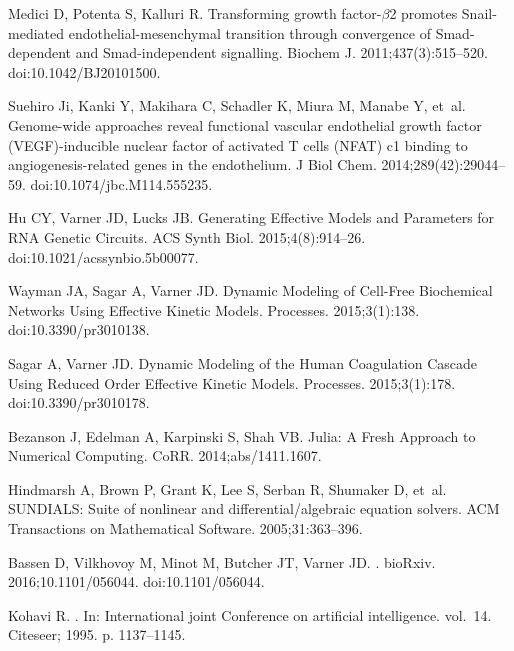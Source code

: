 \documentclass[11pt,letterpaper]{article}
\begin{document}
\begin{thebibliography}{10}
Medici D, Potenta S, Kalluri R.
\newblock Transforming growth factor-$\beta$2 promotes Snail-mediated
  endothelial-mesenchymal transition through convergence of Smad-dependent and
  Smad-independent signalling.
\newblock Biochem J. 2011;437(3):515--520.
\newblock doi:{10.1042/BJ20101500}.

Suehiro Ji, Kanki Y, Makihara C, Schadler K, Miura M, Manabe Y, et~al.
\newblock Genome-wide approaches reveal functional vascular endothelial growth
  factor (VEGF)-inducible nuclear factor of activated T cells (NFAT) c1 binding
  to angiogenesis-related genes in the endothelium.
\newblock J Biol Chem. 2014;289(42):29044--59.
\newblock doi:{10.1074/jbc.M114.555235}.

Hu CY, Varner JD, Lucks JB.
\newblock Generating Effective Models and Parameters for RNA Genetic Circuits.
\newblock ACS Synth Biol. 2015;4(8):914--26.
\newblock doi:{10.1021/acssynbio.5b00077}.

Wayman JA, Sagar A, Varner JD.
\newblock Dynamic Modeling of Cell-Free Biochemical Networks Using Effective
  Kinetic Models.
\newblock Processes. 2015;3(1):138.
\newblock doi:{10.3390/pr3010138}.

Sagar A, Varner JD.
\newblock Dynamic Modeling of the Human Coagulation Cascade Using Reduced Order
  Effective Kinetic Models.
\newblock Processes. 2015;3(1):178.
\newblock doi:{10.3390/pr3010178}.

Bezanson J, Edelman A, Karpinski S, Shah VB.
\newblock Julia: {A} Fresh Approach to Numerical Computing.
\newblock CoRR. 2014;abs/1411.1607.

Hindmarsh A, Brown P, Grant K, Lee S, Serban R, Shumaker D, et~al.
\newblock SUNDIALS: Suite of nonlinear and differential/algebraic equation
  solvers.
\newblock ACM Transactions on Mathematical Software. 2005;31:363--396.

Bassen D, Vilkhovoy M, Minot M, Butcher JT, Varner JD.
.
\newblock bioRxiv. 2016;10.1101/056044.
\newblock doi:{10.1101/056044}.

Kohavi R.
.
\newblock In: International joint Conference on artificial intelligence.
  vol.~14. Citeseer; 1995. p. 1137--1145.


\end{thebibliography}
\end{document}
